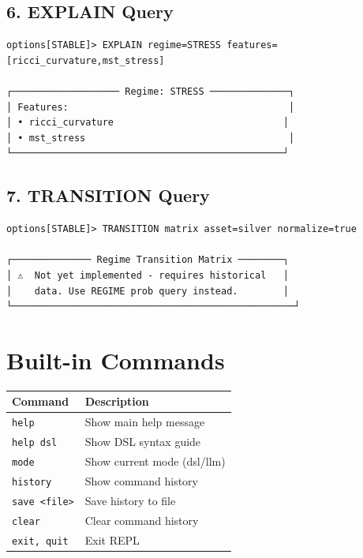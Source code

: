 \documentclass[12pt,oneside,openany]{book}
\begin{document}
\subsection{6. EXPLAIN Query}

\begin{lstlisting}
options[STABLE]> EXPLAIN regime=STRESS features=[ricci_curvature,mst_stress]

┌─────────────────── Regime: STRESS ──────────────┐
│ Features:                                       │
│ • ricci_curvature                              │
│ • mst_stress                                    │
└────────────────────────────────────────────────┘
\end{lstlisting}

\subsection{7. TRANSITION Query}

\begin{lstlisting}
options[STABLE]> TRANSITION matrix asset=silver normalize=true

┌────────────── Regime Transition Matrix ────────┐
│ ⚠️  Not yet implemented - requires historical   │
│    data. Use REGIME prob query instead.        │
└──────────────────────────────────────────────────┘
\end{lstlisting}

\section{Built-in Commands}

\begin{table}[H]
\centering
\begin{tabular}{|l|l|}
\toprule
\textbf{Command} & \textbf{Description} \\
\midrule
\texttt{help} & Show main help message \\
\texttt{help dsl} & Show DSL syntax guide \\
\texttt{mode} & Show current mode (dsl/llm) \\
\texttt{history} & Show command history \\
\texttt{save <file>} & Save history to file \\
\texttt{clear} & Clear command history \\
\texttt{exit, quit} & Exit REPL \\
\bottomrule
\end{tabular}
\end{table}
\end{document}
